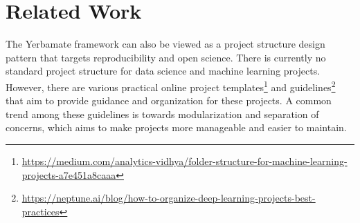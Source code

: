 \section{Related Work}

The Yerbamate framework can also be viewed as a project structure design pattern that targets reproducibility and open science.
There is currently no standard project structure for data science and machine learning projects. However, there are various practical online project templates\footnote{\url{https://medium.com/analytics-vidhya/folder-structure-for-machine-learning-projects-a7e451a8caaa}} and guidelines\footnote{\url{https://neptune.ai/blog/how-to-organize-deep-learning-projects-best-practices}} that aim to provide guidance and organization for these projects. A common trend among these guidelines is towards modularization and separation of concerns, which aims to make projects more manageable and easier to maintain. 



